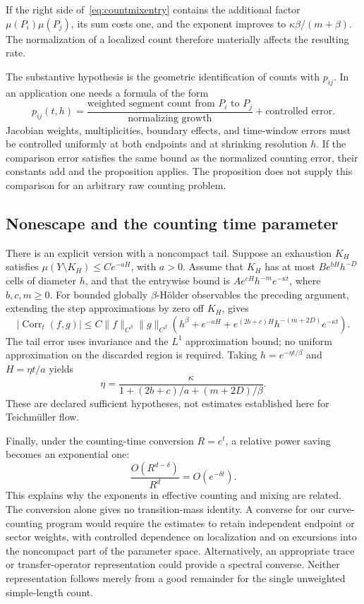 If the right side of~\eqref{eq:countmixentry} contains the additional
factor $\mu(P_i)\mu(P_j)$, its sum costs one, and the exponent
improves to $\kappa\beta/(m+\beta)$. The normalization of a localized
count therefore materially affects the resulting rate.

The substantive hypothesis is the geometric identification of counts
with $p_{ij}$. In an application one needs a formula of the form
\[
 p_{ij}(t,h)=
 \frac{\text{weighted segment count from }P_i\text{ to }P_j}
      {\text{normalizing growth}}
 +\text{controlled error}.
\]
Jacobian weights, multiplicities, boundary effects, and time-window
errors must be controlled uniformly at both endpoints and at shrinking
resolution $h$. If the comparison error satisfies the same bound as
the normalized counting error, their constants add and the proposition
applies. The proposition does not supply this comparison for an
arbitrary raw counting problem.

\subsection{Nonescape and the counting time parameter}
\label{subsec:countmixnoncompact}

There is an explicit version with a noncompact tail. Suppose an
exhaustion $K_H$ satisfies
$\mu(Y\setminus K_H)\leq C e^{-aH}$, with $a>0$.
Assume that $K_H$ has at most $B e^{bH}h^{-D}$ cells of diameter
$h$, and that the entrywise bound is
$A e^{cH}h^{-m}e^{-\kappa t}$, where $b,c,m\geq0$.
For bounded globally $\beta$-H\"older observables the preceding
argument, extending the step approximations by zero off $K_H$, gives
\[
 |\operatorname{Corr}_t(f,g)|
 \leq C\|f\|_{C^\beta}\|g\|_{C^\beta}
 \left(h^\beta+e^{-aH}
       +e^{(2b+c)H}h^{-(m+2D)}e^{-\kappa t}\right).
\]
The tail error uses invariance and the $L^1$ approximation bound;
no uniform approximation on the discarded region is required.
Taking $h=e^{-\eta t/\beta}$ and $H=\eta t/a$ yields
\begin{equation}
 \boxed{\displaystyle
 \eta=
 \frac{\kappa}
 {1+(2b+c)/a+(m+2D)/\beta}.}
 \label{eq:countmixcusprate}
\end{equation}
These are declared sufficient hypotheses, not estimates established
here for Teichm\"uller flow.

Finally, under the counting-time conversion $R=e^t$, a relative power
saving becomes an exponential one:
\[
 \frac{O(R^{d-\delta})}{R^d}=O(e^{-\delta t}).
\]
This explains why the exponents in effective counting and mixing
are related. The conversion alone gives no transition-mass identity.
A converse for our curve-counting program would require the estimates
to retain independent endpoint or sector weights, with controlled
dependence on localization and on excursions into the noncompact
part of the parameter space. Alternatively, an appropriate trace or
transfer-operator representation could provide a spectral converse.
Neither representation follows merely from a good remainder for the
single unweighted simple-length count.

\clearpage
